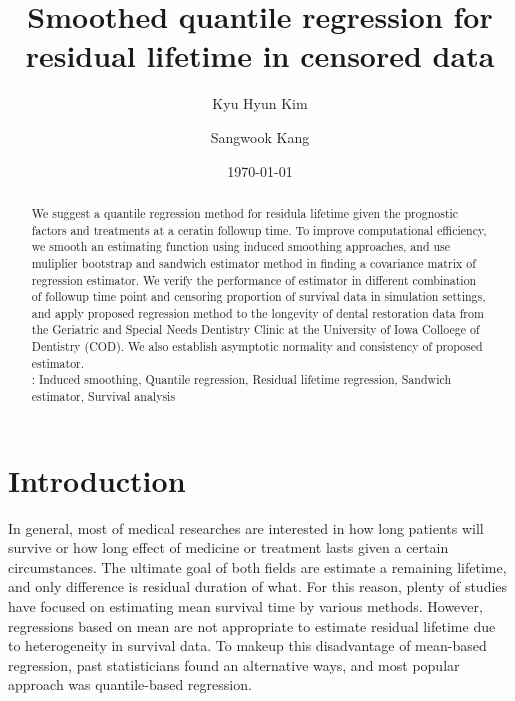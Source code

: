 \documentclass[titlepage,english,12pt]{article}
\title{Smoothed quantile regression for residual lifetime in censored data}
\author{Kyu Hyun Kim}
\author{Sangwook Kang}
\affil{Department of Applied Statistics, Yonsei University}
\date{\today}
\begin{document}
	\maketitle
	
\begin{abstract}
	
	We suggest a quantile regression method for residula lifetime given the prognostic factors and treatments at a ceratin followup time.
	To improve computational efficiency, we smooth an estimating function using induced smoothing approaches, 
	and use muliplier bootstrap and sandwich estimator method in finding a covariance matrix of regression estimator.
	We verify the performance of estimator in different combination of followup time point and censoring proportion of survival data in simulation settings,
	and apply proposed regression method to the longevity of dental restoration data from the Geriatric and Special Needs Dentistry Clinic at the University of Iowa Colloege of Dentistry (COD). 
	We also establish asymptotic normality and consistency of proposed estimator.\\
	
	: {Induced smoothing, Quantile regression, Residual lifetime regression, Sandwich estimator, Survival analysis}
	
\end{abstract}

\section{Introduction}

	In general, most of medical researches are interested in how long patients will survive or how long effect of medicine or treatment lasts given a certain circumstances.
	The ultimate goal of both fields are estimate a remaining lifetime, and only difference is residual duration of what.
	For this reason, plenty of studies have focused on estimating mean survival time by various methods.
	However, regressions based on mean are not appropriate to estimate residual lifetime due to heterogeneity in survival data.
	To makeup this disadvantage of mean-based regression, past statisticians found an alternative ways, and most popular approach was quantile-based regression.
	
\end{document}

